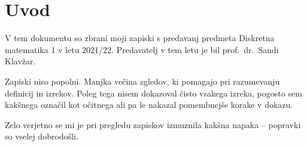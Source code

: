 \section*{Uvod}

V tem dokumentu so zbrani moji zapiski s predavanj predmeta
Diskretna matematika 1 v letu 2021/22. Predavatelj v tem letu je
bil prof.~dr.~Sandi Klavžar.

Zapiski niso popolni. Manjka večina zgledov, ki pomagajo pri
razumevanju definicij in izrekov. Poleg tega nisem dokazoval čisto
vsakega izreka, pogosto sem kakšnega označil kot očitnega ali pa le
nakazal pomembnejše korake v dokazu.

Zelo verjetno se mi je pri pregledu zapiskov izmuznila kakšna napaka
-- popravki so vselej dobrodošli.

